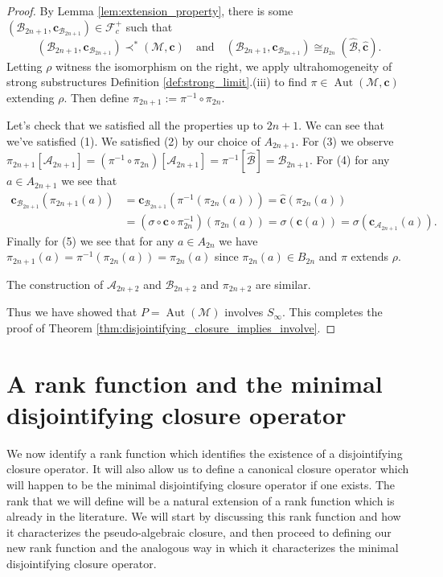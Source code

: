 \documentclass[12pt]{amsart}
\theoremstyle{plain}
\theoremstyle{definition}
\newcommand{\isom}{\cong}
\newcommand{\mcA}{\mathcal{A}}
\newcommand{\mcB}{\mathcal{B}}
\newcommand{\mcF}{\mathcal{F}}
\newcommand{\mcM}{\mathcal{M}}
\newcommand{\oc}{\mathbf{c}}
\DeclareMathOperator{\Aut}{Aut}
\begin{document}
\begin{proof}
By Lemma \ref{lem:extension_property}, there is some $(\mcB_{2n+1}, \oc_{\mcB_{2n+1}}) \in \mcF^+_c$ such that
\begin{equation}\label{eq:B_strong2}
(\mcB_{2n+1}, \oc_{\mcB_{2n+1}}) \prec^* (\mcM, \oc) \quad \text{and} \quad (\mcB_{2n+1}, \oc_{\mcB_{2n+1}}) \isom_{B_{2n}} (\hat{\mcB}, \hat{\oc}).
\end{equation}
Letting $\rho$ witness the isomorphism on the right, we apply ultrahomogeneity of strong substructures Definition \ref{def:strong_limit}.(iii) to find $\pi \in \Aut(\mcM, \oc)$ extending $\rho$.
Then define $\pi_{2n+1} := \pi^{-1} \circ \pi_{2n}$.

Let's check that we satisfied all the properties up to $2n+1$.
We can see that we've satisfied (1).
We satisfied (2) by our choice of $A_{2n+1}$.
For (3) we observe $\pi_{2n+1}[\mcA_{2n+1}] = (\pi^{-1} \circ \pi_{2n})[\mcA_{2n+1}] = \pi^{-1}[\hat{\mcB}] = \mcB_{2n+1}$.
For (4) for any $a \in A_{2n+1}$ we see that 
\begin{align*}
\oc_{\mcB_{2n+1}}(\pi_{2n+1}(a)) &= \oc_{\mcB_{2n+1}}(\pi^{-1}(\pi_{2n}(a))) = \hat{\oc}(\pi_{2n}(a)) \\
&= (\sigma \circ \oc \circ \pi_{2n}^{-1})(\pi_{2n}(a)) = \sigma(\oc(a)) = \sigma(\oc_{\mcA_{2n+1}}(a)).
\end{align*}
Finally for (5) we see that for any $a \in A_{2n}$ we have $\pi_{2n+1}(a) = \pi^{-1}(\pi_{2n}(a)) = \pi_{2n}(a)$ since $\pi_{2n}(a) \in B_{2n}$ and $\pi$ extends $\rho$.

The construction of $\mcA_{2n+2}$ and $\mcB_{2n+2}$ and $\pi_{2n+2}$ are similar.

Thus we have showed that $P = \Aut(\mcM)$ involves $S_\infty$.
This completes the proof of Theorem \ref{thm:disjointifying_closure_implies_involve}.
\end{proof}

\section{A rank function and the minimal disjointifying closure operator}\label{sec:rank}

We now identify a rank function which identifies the existence of a disjointifying closure operator. It will also allow us to define a canonical closure operator which will happen to be the minimal disjointifying closure operator if one exists.
The rank that we will define will be a natural extension of a rank function which is already in the literature.
We will start by discussing this rank function and how it characterizes the pseudo-algebraic closure, and then proceed to defining our new rank function and the analogous way in which it characterizes the minimal disjointifying closure operator.
\end{document}
